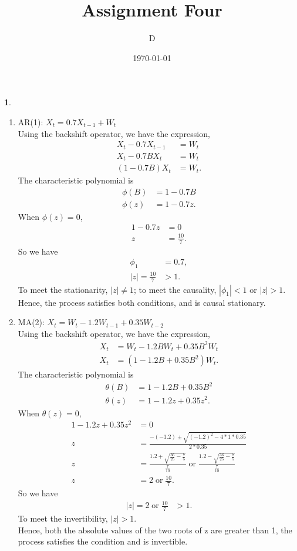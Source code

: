 \documentclass[10pt]{article}
\author{D}
\newtheorem{prob}{\bm{$Problem$}}
\begin{document}
\title{Assignment Four}
\date{\today}
\maketitle
\thispagestyle{fancy}
\thispagestyle{fancy}

\begin{prob}
\end{prob}
\begin{enumerate}[1)]
\vspace{3mm}

\item
AR(1): $X_t=0.7X_{t-1}+W_t$\\
Using the backshift operator, we have the expression,
\begin{align*}
X_t-0.7X_{t-1}&=W_t\\
X_t-0.7BX_t&=W_t\\
(1-0.7B)X_t&=W_t.
\end{align*}
The characteristic polynomial is
\begin{align*}
\phi(B)&=1-0.7B\\
\phi(z)&=1-0.7z.
\end{align*}
When $\phi(z)=0$,
\begin{align*}
1-0.7z&=0\\
z&=\frac{10}{7}.
\end{align*}
So we have
\begin{align*}
\phi_1&=0.7,\\
|z|=\frac{10}{7}&>1.
\end{align*}
To meet the stationarity, $|z|\neq1$; to meet the causality, $|\phi_1|<1$ or $|z|>1$.\\
Hence, the process satisfies both conditions, and is causal stationary.

\item
MA(2): $X_t=W_t-1.2W_{t-1}+0.35W_{t-2}$\\
Using the backshift operator, we have the expression,
\begin{align*}
X_t&=W_t-1.2BW_t+0.35B^2W_t\\
X_t&=(1-1.2B+0.35B^2)W_t.
\end{align*}
The characteristic polynomial is
\begin{align*}
\theta(B)&=1-1.2B+0.35B^2\\
\theta(z)&=1-1.2z+0.35z^2.
\end{align*}
When $\theta(z)=0$,
\begin{align*}
1-1.2z+0.35z^2&=0\\
z&=\frac{-(-1.2)\pm\sqrt{(-1.2)^2-4*1*0.35}}{2*0.35}\\
z&=\frac{1.2+\sqrt{\frac{36}{25}-\frac{7}{5}}}{\frac{7}{10}}\;\textrm{or}\;\frac{1.2-\sqrt{\frac{36}{25}-\frac{7}{5}}}{\frac{7}{10}}\\
z&=2\;\textrm{or}\;\frac{10}{7}.
\end{align*}
So we have
\begin{align*}
|z|=2\;\textrm{or}\;\frac{10}{7}&>1.
\end{align*}
To meet the invertibility, $|z|>1$.\\
Hence, both the absolute values of the two roots of z are greater than 1, the process satisfies the condition and is invertible.


\end{enumerate}
\end{document}
